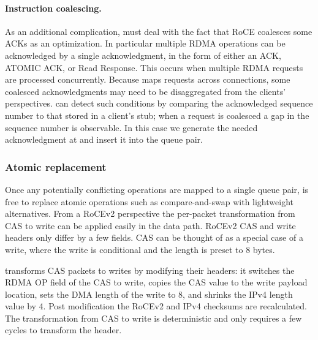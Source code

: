 \paragraph{Instruction coalescing.}

As an additional complication, {\sword} must deal with the fact
that RoCE coalesces some ACKs as an optimization.  In particular
multiple RDMA operations can be acknowledged by a single
acknowledgment, in the form of either an ACK, ATOMIC ACK, or Read
Response. This occurs when multiple RDMA requests are processed
concurrently.  Because {\sword} maps requests across connections, some
coalesced acknowledgments may need to be disaggregated from the
clients' perspectives.
%
{\sword} can detect such conditions by comparing the
acknowledged sequence number to that stored in a client's stub; when a
request is coalesced a gap in the sequence number is observable. In
this case we generate the needed acknowledgment at {\sword} and
insert it into the queue pair.



\subsubsection{Atomic replacement} 

Once any potentially conflicting operations are mapped to a single
queue pair, {\sword} is free to replace atomic operations such as
compare-and-swap with lightweight alternatives.  From a RoCEv2 perspective
the per-packet transformation from CAS to write can be applied easily
in the data path.  RoCEv2 CAS and write headers only differ by a few
fields. CAS can be thought of as a special case of a write, where the
write is conditional and the length is preset to 8 bytes.

{\sword} transforms CAS packets to writes by modifying their headers: it
switches the RDMA OP field of the CAS to write, copies the CAS
value to the write payload location, sets the DMA length of the write
to 8, and shrinks the IPv4 length value by 4.  Post modification the RoCEv2
and IPv4 checksums are recalculated.
The transformation from CAS to write
is deterministic and only requires a few cycles to transform the
header.

